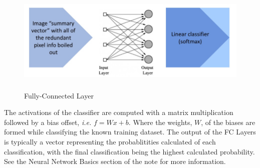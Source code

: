 \documentclass[twoside]{article}
\begin{document}
\begin{figure}[!htb]
\centering
\includegraphics[height = 2in]{pics/Fully-Connected Layer.jpg}
\caption{Fully-Connected Layer\cite{cs231n-website}}
\label{fig:fc layer}
\end{figure}

The activations of the classifier are computed with a matrix multiplication followed by a bias offset, \textit{i.e.} $f = Wx + b$. Where the weights, $W$, of the biases are formed while classifying the known training dataset. The output of the FC Layers is typically a vector representing the probablitities calculated of each classification, with the final classification being the highest calculated probability. See the Neural Network Basics section of the note for more information.
\end{document}
